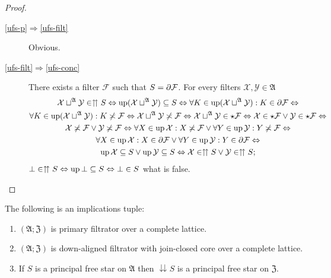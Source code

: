 \begin{proof}
~
\begin{description}
\item [{\ref{ufs-p}$\Rightarrow$\ref{ufs-filt}}] Obvious.
\item [{\ref{ufs-filt}$\Rightarrow$\ref{ufs-conc}}] There exists a filter
$\mathcal{F}$ such that $S=\partial\mathcal{F}$. For every filters
$\mathcal{X},\mathcal{Y}\in\mathfrak{A}$
\begin{multline*}
\mathcal{X}\sqcup^{\mathfrak{A}}\mathcal{Y}\in\upuparrows S\Leftrightarrow\operatorname{up}(\mathcal{X}\sqcup^{\mathfrak{A}}\mathcal{Y})\subseteq S\Leftrightarrow\forall K\in\operatorname{up}(\mathcal{X}\sqcup^{\mathfrak{A}}\mathcal{Y}):K\in\partial\mathcal{F}\Leftrightarrow\\
\forall K\in\operatorname{up}(\mathcal{X}\sqcup^{\mathfrak{A}}\mathcal{Y}):K\not\asymp\mathcal{F}\Leftrightarrow\mathcal{X}\sqcup^{\mathfrak{A}}\mathcal{Y}\not\asymp\mathcal{F}\Leftrightarrow\mathcal{X}\sqcup^{\mathfrak{A}}\mathcal{Y}\in\star\mathcal{F}\Leftrightarrow\mathcal{X}\in\star\mathcal{F}\vee\mathcal{Y}\in\star\mathcal{F}\Leftrightarrow\\
\mathcal{X}\not\asymp\mathcal{F}\vee\mathcal{Y}\not\asymp\mathcal{F}\Leftrightarrow\forall X\in\operatorname{up}\mathcal{X}:X\not\asymp\mathcal{F}\vee\forall Y\in\operatorname{up}\mathcal{Y}:Y\not\asymp\mathcal{F}\Leftrightarrow\\
\forall X\in\operatorname{up}\mathcal{X}:X\in\partial\mathcal{F}\vee\forall Y\in\operatorname{up}\mathcal{Y}:Y\in\partial\mathcal{F}\Leftrightarrow\\
\operatorname{up}\mathcal{X}\subseteq S\vee\operatorname{up}\mathcal{Y}\subseteq S\Leftrightarrow\mathcal{X}\in\upuparrows S\vee\mathcal{Y}\in\upuparrows S;
\end{multline*}
$\bot\in\upuparrows S\Leftrightarrow\operatorname{up}\bot\subseteq S\Leftrightarrow\bot\in S$
what is false.
\end{description}
\end{proof}
\begin{prop}
The following is an implications tuple:
\begin{enumerate}
\item \label{dpfs-p}$(\mathfrak{A};\mathfrak{Z})$ is primary filtrator
over a complete lattice.
\item \label{dpfs-fltr}$(\mathfrak{A};\mathfrak{Z})$ is down-aligned filtrator
with join-closed core over a complete lattice.
\item \label{dpfs-conc}If $S$ is a principal free star on $\mathfrak{A}$
then $\downdownarrows S$ is a principal free star on $\mathfrak{Z}$.
\end{enumerate}
\end{prop}
